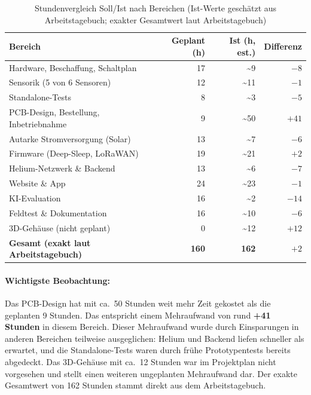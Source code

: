 \begin{table}[H]
  \centering
  \begin{tabularx}{\textwidth}{X r r r}
    \toprule
    \textbf{Bereich} & \textbf{Geplant (h)} & \textbf{Ist (h, est.)} & \textbf{Differenz} \\
    \midrule
    Hardware, Beschaffung, Schaltplan & 17 & \textasciitilde9 & $-8$ \\
    Sensorik (5 von 6 Sensoren) & 12 & \textasciitilde11 & $-1$ \\
    Standalone-Tests & 8 & \textasciitilde3 & $-5$ \\
    PCB-Design, Bestellung, Inbetriebnahme & 9 & \textasciitilde50 & $+41$ \\
    Autarke Stromversorgung (Solar) & 13 & \textasciitilde7 & $-6$ \\
    Firmware (Deep-Sleep, LoRaWAN) & 19 & \textasciitilde21 & $+2$ \\
    Helium-Netzwerk \& Backend & 13 & \textasciitilde6 & $-7$ \\
    Website \& App & 24 & \textasciitilde23 & $-1$ \\
    KI-Evaluation & 16 & \textasciitilde2 & $-14$ \\
    Feldtest \& Dokumentation & 16 & \textasciitilde10 & $-6$ \\
    3D-Gehäuse (nicht geplant) & 0 & \textasciitilde12 & $+12$ \\
    \midrule
    \textbf{Gesamt (exakt laut Arbeitstagebuch)} & \textbf{160} & \textbf{162} & $+2$ \\
    \bottomrule
  \end{tabularx}
  \caption{Stundenvergleich Soll/Ist nach Bereichen (Ist-Werte geschätzt aus Arbeitstagebuch; exakter Gesamtwert laut Arbeitstagebuch)}
  \label{tab:stunden-vergleich}
\end{table}

\paragraph{Wichtigste Beobachtung:} Das PCB-Design hat mit ca.\ 50 Stunden weit mehr Zeit gekostet als die geplanten 9 Stunden. Das entspricht einem Mehraufwand von rund \textbf{+41 Stunden} in diesem Bereich. Dieser Mehraufwand wurde durch Einsparungen in anderen Bereichen teilweise ausgeglichen: Helium und Backend liefen schneller als erwartet, und die Standalone-Tests waren durch frühe Prototypentests bereits abgedeckt. Das 3D-Gehäuse mit ca.\ 12 Stunden war im Projektplan nicht vorgesehen und stellt einen weiteren ungeplanten Mehraufwand dar. Der exakte Gesamtwert von 162 Stunden stammt direkt aus dem Arbeitstagebuch.

